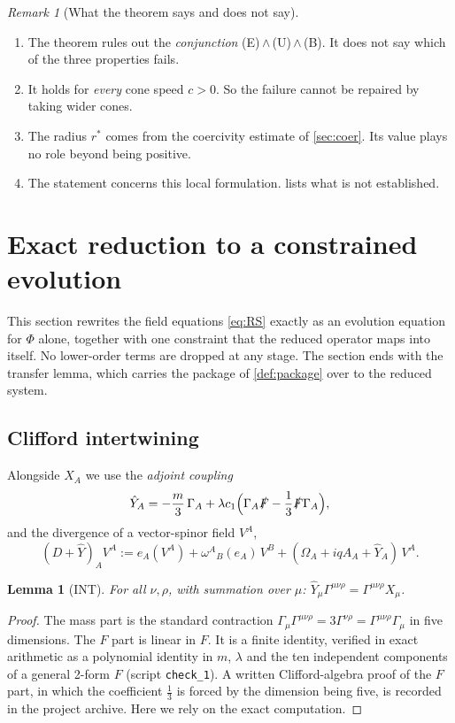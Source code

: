 \documentclass[11pt]{article}
\theoremstyle{plain}
\newtheorem{lemma}[theorem]{Lemma}
\theoremstyle{definition}
\theoremstyle{remark}
\newtheorem{remark}[theorem]{Remark}
\begin{document}
\begin{remark}[What the theorem says and does not say]\label{rem:scope}
\leavevmode
\begin{enumerate}
  \item The theorem rules out the \emph{conjunction} (E)\,$\wedge$\,(U)\,$\wedge$\,(B). It does not say which of the three properties fails.
  \item It holds for \emph{every} cone speed $c > 0$. So the failure cannot be repaired by taking wider cones.
  \item The radius $r^*$ comes from the coercivity estimate of \cref{sec:coer}. Its value plays no role beyond being positive.
  \item The statement concerns this local formulation.  lists what is not established.
\end{enumerate}
\end{remark}

\section{Exact reduction to a constrained evolution}\label{sec:reduction}

This section rewrites the field equations \eqref{eq:RS} exactly as an evolution equation for $\Phi$ alone, together with one constraint that the reduced operator maps into itself. No lower-order terms are dropped at any stage. The section ends with the transfer lemma, which carries the package of \cref{def:package} over to the reduced system.

\subsection{Clifford intertwining}\label{sec:int}

Alongside $X_A$ we use the \emph{adjoint coupling}
\[
  \hat Y_A = -\frac{m}{3}\,\Gamma_A + \lambda c_1\Bigl(\Gamma_A\slashed{F} - \frac13\slashed{F}\Gamma_A\Bigr),
\]
and the divergence of a vector-spinor field $V^A$,
\[
  (D+\hat Y)_A V^A := e_A(V^A) + \omega^{A}{}_{B}(e_A)\,V^B + (\Omega_A + iqA_A + \hat Y_A)\,V^A .
\]

\begin{lemma}[INT]\label{lem:int}
For all $\nu,\rho$, with summation over $\mu$: $\hat Y_\mu\Gamma^{\mu\nu\rho} = \Gamma^{\mu\nu\rho}X_\mu$.
\end{lemma}

\begin{proof}
The mass part is the standard contraction $\Gamma_\mu\Gamma^{\mu\nu\rho} = 3\Gamma^{\nu\rho} = \Gamma^{\mu\nu\rho}\Gamma_\mu$ in five dimensions. The $F$ part is linear in $F$. It is a finite identity, verified in exact arithmetic as a polynomial identity in $m$, $\lambda$ and the ten independent components of a general 2-form $F$ (script \texttt{check\_1}). A written Clifford-algebra proof of the $F$ part, in which the coefficient $\tfrac13$ is forced by the dimension being five, is recorded in the project archive. Here we rely on the exact computation.
\end{proof}
\end{document}
